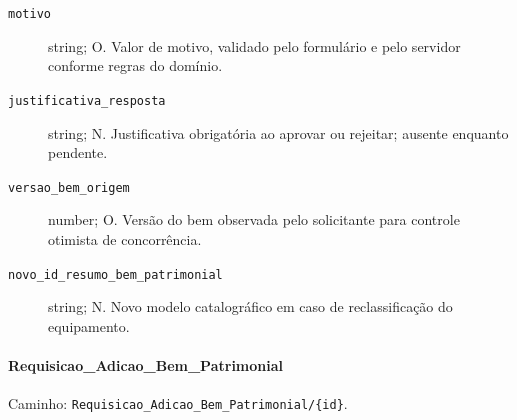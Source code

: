 \begin{description}
\item[\texttt{motivo}] string; O. Valor de motivo, validado pelo formulário e pelo servidor conforme regras do domínio.
\item[\texttt{justificativa\_resposta}] string; N. Justificativa obrigatória ao aprovar ou rejeitar; ausente enquanto pendente.
\item[\texttt{versao\_bem\_origem}] number; O. Versão do bem observada pelo solicitante para controle otimista de concorrência.
\item[\texttt{novo\_id\_resumo\_bem\_patrimonial}] string; N. Novo modelo catalográfico em caso de reclassificação do equipamento.
\end{description}

\paragraph{Requisicao\_Adicao\_Bem\_Patrimonial}\mbox{}\par
Caminho: \texttt{Requisicao\_Adicao\_Bem\_Patrimonial/\{id\}}.
